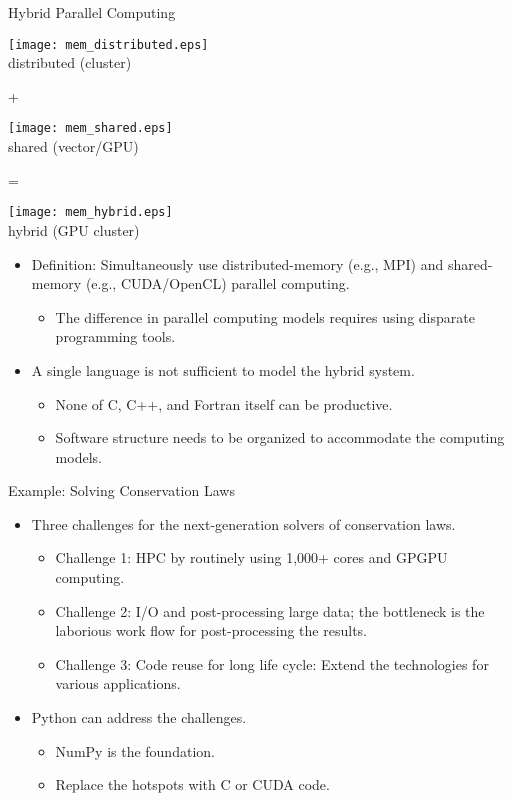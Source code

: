 \documentclass[dvips,xcolor=pst]{beamer}
\begin{document}
\begin{frame}{
%
Hybrid Parallel Computing
%
}
\begin{minipage}[c]{\textwidth}\centering
\parbox{0.3\textwidth}{\centering
\texttt{[image: mem\_distributed.eps]} \\ distributed
(cluster)}
+ 
\parbox{0.3\textwidth}{\centering 
\texttt{[image: mem\_shared.eps]} \\ shared (vector/GPU)}
= 
\parbox{0.3\textwidth}{\centering
\texttt{[image: mem\_hybrid.eps]} \\ hybrid (GPU cluster)}
\end{minipage}
\begin{itemize}
  \item Definition: Simultaneously use distributed-memory (e.g., MPI) and
  shared-memory (e.g., CUDA/OpenCL) parallel computing.
  \begin{itemize}
    \item The difference in parallel computing models requires using disparate
    programming tools.
  \end{itemize}
  \item A single language is not sufficient to model the hybrid system.
  \begin{itemize}
    \item None of C, C++, and Fortran itself can be productive.
    \item Software structure needs to be organized to accommodate the computing
    models.
  \end{itemize}
\end{itemize}
\end{frame}

\begin{frame}{
%
Example: Solving Conservation Laws
%
} \large
\begin{itemize}
  \item Three challenges for the next-generation solvers of conservation laws.
  \begin{itemize} \large
    \item Challenge 1: HPC by routinely using 1,000+ cores and GPGPU computing.
    \item Challenge 2: I/O and post-processing large data; the bottleneck is
    the laborious work flow for post-processing the results.
    \item Challenge 3: Code reuse for long life cycle: Extend the technologies
    for various applications.
  \end{itemize}
  \item Python can address the challenges.
  \begin{itemize} \large
    \item NumPy is the foundation.
    \item Replace the hotspots with C or CUDA code.
  \end{itemize}
\end{itemize}
\end{frame}
\end{document}
